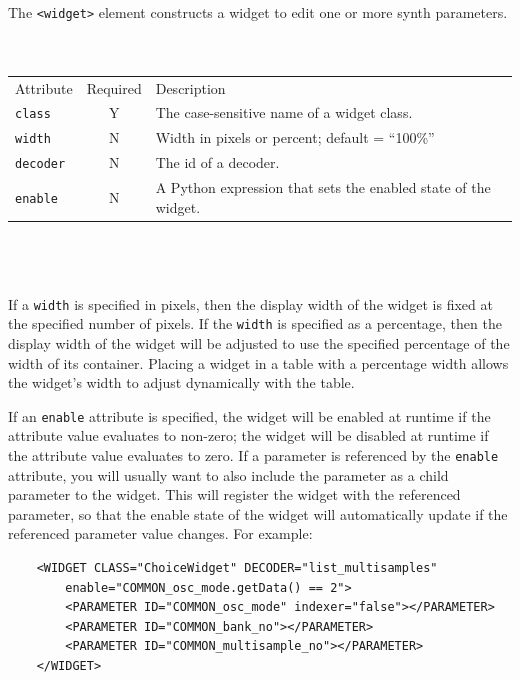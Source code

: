 \documentclass[a4paper,twoside,12pt]{article}
\newcommand{\code}[1]{\color{red}\texttt{#1}\color{black}}
\begin{document}
The \code{<widget>}{} element constructs a widget to edit one or
more synth parameters.
\\
\\
\\
\begin{tabular}{|l|c|p{9cm}|}
\hline
Attribute & Required & Description \\
\code{class} & Y & The case-sensitive name of a widget class. \\
\code{width} & N & Width in pixels or percent; default = ``100\%'' \\
\code{decoder} & N & The id of a decoder. \\
\code{enable} & N & A Python expression that sets the
enabled state of the widget. \\
\hline
\end{tabular}
\\
\\
\\
If a \code{width}{} is specified in pixels, then the display width
of the widget is fixed at the specified number of pixels. If the
\code{width}{} is specified as a percentage, then the display
width of the widget will be adjusted to use the specified
percentage of the width of its container. Placing a widget in a
table with a percentage width allows the widget's width to adjust
dynamically with the table.

If an \code{enable}{} attribute is specified, the widget will be
enabled at runtime if the attribute value evaluates to non-zero;
the widget will be disabled at runtime if the attribute value
evaluates to zero. If a parameter is referenced by the
\code{enable}{} attribute, you will usually want to also include
the parameter as a child parameter to the widget. This will
register the widget with the referenced parameter, so that the
enable state of the widget will automatically update if the
referenced parameter value changes. For example:

\begin{verbatim}
    <WIDGET CLASS="ChoiceWidget" DECODER="list_multisamples"
        enable="COMMON_osc_mode.getData() == 2">
        <PARAMETER ID="COMMON_osc_mode" indexer="false"></PARAMETER>
        <PARAMETER ID="COMMON_bank_no"></PARAMETER>
        <PARAMETER ID="COMMON_multisample_no"></PARAMETER>
    </WIDGET>
\end{verbatim}
\end{document}
